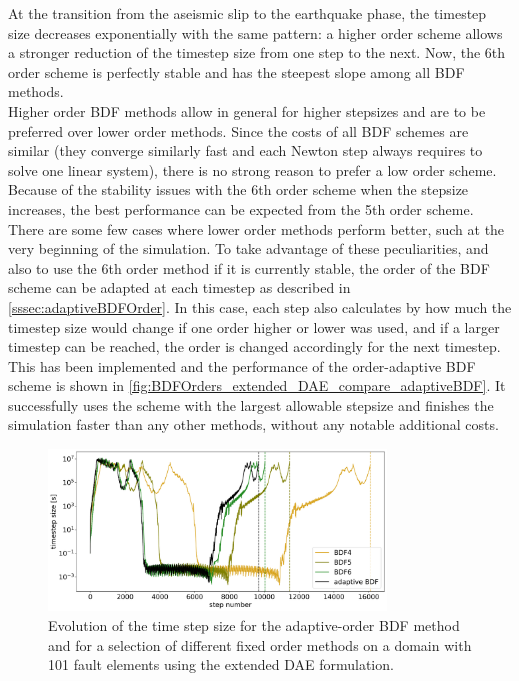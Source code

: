 At the transition from the aseismic slip to the earthquake phase, the timestep size decreases exponentially with the same pattern: a higher order scheme allows a stronger reduction of the timestep size from one step to the next. Now, the 6th order scheme is perfectly stable and has the steepest slope among all BDF methods. \\


Higher order BDF methods allow in general for higher stepsizes and are to be preferred over lower order methods. Since the costs of all BDF schemes are similar (they converge similarly fast and each Newton step always requires to solve one linear system), there is no strong reason to prefer a low order scheme. Because of the stability issues with the 6th order scheme when the stepsize increases, the best performance can be expected from the 5th order scheme. There are some few cases where lower order methods perform better, such at the very beginning of the simulation. To take advantage of these peculiarities, and also to use the 6th order method if it is currently stable, the order of the BDF scheme can be adapted at each timestep as described in \autoref{sssec:adaptiveBDFOrder}. In this case, each step also calculates by how much the timestep size would change if one order higher or lower was used, and if a larger timestep can be reached, the order is changed accordingly for the next timestep. This has been implemented and the performance of the order-adaptive BDF scheme is shown in \autoref{fig:BDFOrders_extended_DAE_compare_adaptiveBDF}. It successfully uses the scheme with the largest allowable stepsize and finishes the simulation faster than any other methods, without any notable additional costs. 


\begin{figure}[H]
	\centering
	\includegraphics[width=0.8\textwidth]{images/TANDEMTimeAnalysisDifferentBDFOrders_Lagrange_ExtendedDAE_Size101_FULLTIME.png}
	\caption{Evolution of the time step size for the adaptive-order BDF method and for a selection of different fixed order methods on a domain with 101 fault elements using the extended DAE formulation.}
	\label{fig:BDFOrders_extended_DAE_compare_adaptiveBDF}
\end{figure}


